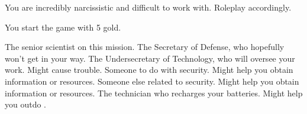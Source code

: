 \documentclass[char]{guildcamp3}
\begin{document}
\begin{itemz}[Notes]
	\item You are incredibly narcissistic and difficult to work with. Roleplay accordingly.  
	\item You start the game with 5 gold. 
\end{itemz}


\begin{contacts}
  \contact{\cSciOne{}} The senior scientist on this mission.
  \contact{\cPoliOne{}} The Secretary of Defense, who hopefully won't get in your way.
  \contact{\cPoliTwo{}} The Undersecretary of Technology, who will oversee your work. Might cause trouble.
  \contact{\cSpecOpOne{}} Someone to do with security. Might help you obtain information or resources.
  \contact{\cSpecOpTwo{}} Someone else related to security. Might help you obtain information or resources.
  \contact{\cTech{}} The technician who recharges your batteries. Might help you outdo \cSciOne{}.
\end{contacts}
\end{document}
